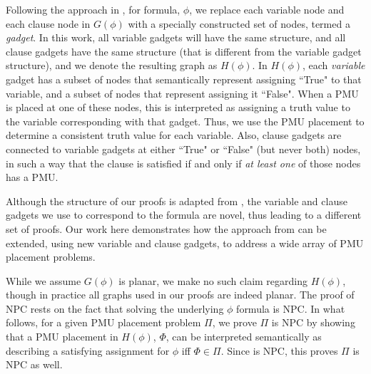 Following the approach in \cite{Brueni05}, for \sat formula, $\phi$, we replace each variable node and each clause node in $G(\phi)$ with a specially constructed set of nodes,
termed a {\em gadget}. In this work, all variable gadgets will have the same structure, and all clause gadgets have the same structure (that is different from the variable gadget structure), 
and we denote the resulting graph as $H(\phi)$. In $H(\phi)$, each {\em variable} gadget has a subset of nodes that semantically represent assigning ``True" to that variable, and a subset of 
nodes that represent assigning it ``False". When a PMU is placed at one of these nodes, this is interpreted as assigning a truth value to the \sat variable corresponding with that gadget. 
Thus, we use the PMU placement to determine a consistent truth value for each \sat variable. Also, clause gadgets are connected to variable gadgets at either ``True" or ``False" (but never both) 
nodes, in such a way that the clause is satisfied if and only if {\em at least one} of those nodes has a PMU.

Although the structure of our proofs is adapted from \cite{Brueni05}, the variable and clause gadgets we use to correspond to the \sat formula are novel, thus leading to a 
different set of proofs. Our work here demonstrates how the approach from \cite{Brueni05} can be extended, using new variable and clause gadgets, to address a wide array of PMU placement problems.

While we assume $G(\phi)$ is planar, we make no such claim regarding $H(\phi)$, though in practice all graphs used in our proofs are indeed planar. The proof of NPC rests on the fact that 
solving the underlying $\phi$ formula is NPC. In what follows, for a given PMU placement problem $\Pi$, we prove $\Pi$ is NPC by showing that a PMU placement in $H(\phi)$, $\Phi$, can be 
interpreted semantically as describing a satisfying assignment for $\phi$ iff $\Phi\in\Pi$. 
Since \sat is NPC, this proves $\Pi$ is  NPC as well. 



